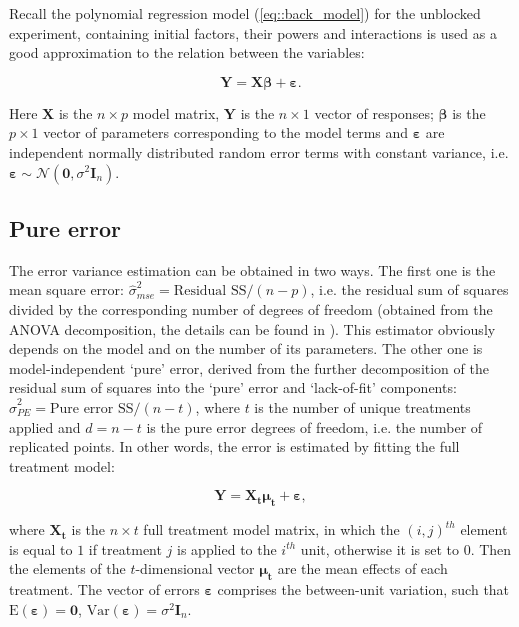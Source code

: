 \documentclass[11pt]{article}
\begin{document}
Recall the polynomial regression model (\ref{eq::back_model}) for the unblocked experiment, containing initial factors, their powers and interactions is used as a good approximation to the relation between the variables:  

\begin{equation}
\label{eq::back_model}
\bm{Y}=\bm{X\beta}+\bm{\varepsilon}.
\end{equation} 

Here $\bm{X}$ is the $n\times p$ model matrix, $\bm{Y}$ is the $n\times 1$ vector of responses; $\bm{\beta}$ is the $p\times 1$ vector of parameters corresponding to the model terms and $\bm{\varepsilon}$ are independent normally distributed random error terms with constant variance, i.e. $\bm{\varepsilon}\sim \mathcal{N}(\bm{0},\sigma^{2}\bm{I}_{n})$.

\subsection{Pure error}
The error variance estimation can be obtained in two ways. The first one is the mean square error: $\hat{\sigma}^2_{mse}=\mbox{Residual SS}/(n-p)$, i.e. the residual sum of squares divided by the corresponding number of degrees of freedom (obtained from the ANOVA decomposition, the details can be found in \cite{Draper1998}). This estimator obviously depends on the model and on the number of its parameters. The other one is model-independent `pure' error, derived from the further decomposition of the residual sum of squares into the `pure' error and `lack-of-fit' components: $\hat{\sigma}^2_{PE}=\mbox{Pure error SS}/(n-t)$, where $t$ is the number of unique treatments applied and $d=n-t$ is the pure error degrees of freedom, i.e. the number of replicated points. In other words, the error is estimated by fitting the full treatment model:

\begin{equation}
\label{eq::back_trnt}
\bm{Y}=\bm{X_{t}\mu_{t}}+\bm{\varepsilon},
\end{equation} 

where $\bm{X_{t}}$ is the $n\times t$ full treatment model matrix, in which the $(i,j)^{th}$ element is equal to $1$ if treatment $j$ is applied to the $i^{th}$ unit, otherwise it is set to $0$. Then the elements of the $t$-dimensional vector $\bm{\mu_{t}}$ are the mean effects of each treatment. The vector of errors $\bm{\varepsilon}$ comprises the between-unit variation, such that $\mbox{E}(\bm{\varepsilon})=\bm{0}$, $\mbox{Var}(\bm{\varepsilon})=\sigma^2\bm{I}_{n}$.
\end{document}
